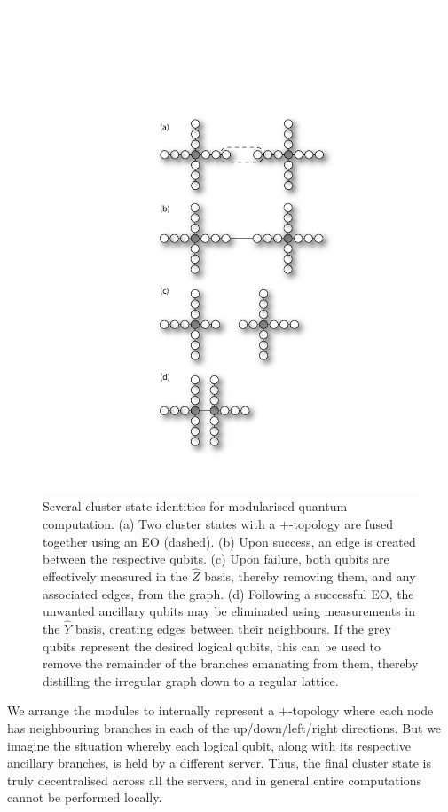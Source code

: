 \documentclass[aps,rmp,twocolumn,amsmath,amssymb,nofootinbib,superscriptaddress,longbibliography,floatfix,table-of-contents,eqsecnum]{revtex4-1}
\begin{document}
\begin{figure}[!htb]
\includegraphics[width=0.9\columnwidth]{cluster_ident}
\caption{Several cluster state identities for modularised quantum computation. (a) Two cluster states with a $+$-topology are fused together using an EO (dashed). (b) Upon success, an edge is created between the respective qubits. (c) Upon failure, both qubits are effectively measured in the $\hat{Z}$ basis, thereby removing them, and any associated edges, from the graph. (d) Following a successful EO, the unwanted ancillary qubits may be eliminated using measurements in the $\hat{Y}$ basis, creating edges between their neighbours. If the grey qubits represent the desired logical qubits, this can be used to remove the remainder of the branches emanating from them, thereby distilling the irregular graph down to a regular lattice.} \label{fig:plus_cluster_ident}
\end{figure}

We arrange the modules to internally represent a $+$-topology where each node has neighbouring branches in each of the up/down/left/right directions. But we imagine the situation whereby each logical qubit, along with its respective ancillary branches, is held by a different server. Thus, the final cluster state is truly decentralised across all the servers, and in general entire computations cannot be performed locally.
\end{document}
